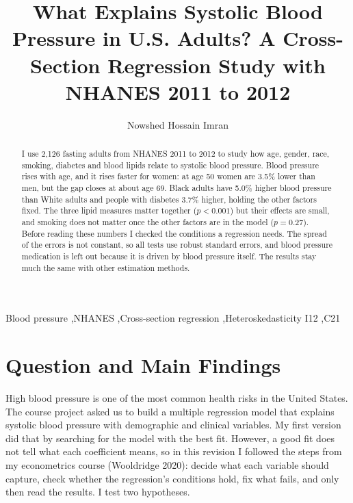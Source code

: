 \documentclass[preprint,letterpaper,11pt,authoryear]{elsarticle}
\begin{document}
\renewcommand{\topfraction}{0.9}
\renewcommand{\textfraction}{0.1}
\renewcommand{\floatpagefraction}{0.8}

\begin{frontmatter}

\title{What Explains Systolic Blood Pressure in U.S. Adults? A Cross-Section Regression Study with NHANES 2011 to 2012}

\author{Nowshed Hossain Imran}

\begin{abstract}
I use 2,126 fasting adults from NHANES 2011 to 2012 to study how age, gender, race, smoking, diabetes and blood lipids relate to systolic blood pressure. Blood pressure rises with age, and it rises faster for women: at age 50 women are 3.5\% lower than men, but the gap closes at about age 69. Black adults have 5.0\% higher blood pressure than White adults and people with diabetes 3.7\% higher, holding the other factors fixed. The three lipid measures matter together ($p < 0.001$) but their effects are small, and smoking does not matter once the other factors are in the model ($p = 0.27$). Before reading these numbers I checked the conditions a regression needs. The spread of the errors is not constant, so all tests use robust standard errors, and blood pressure medication is left out because it is driven by blood pressure itself. The results stay much the same with other estimation methods.
\end{abstract}

\begin{keyword}
Blood pressure \sep NHANES \sep Cross-section regression \sep Heteroskedasticity
\JEL I12 \sep C21
\end{keyword}

\end{frontmatter}

\section{Question and Main Findings}

High blood pressure is one of the most common health risks in the United States. The course project asked us to build a multiple regression model that explains systolic blood pressure with demographic and clinical variables. My first version did that by searching for the model with the best fit. However, a good fit does not tell what each coefficient means, so in this revision I followed the steps from my econometrics course (Wooldridge 2020): decide what each variable should capture, check whether the regression's conditions hold, fix what fails, and only then read the results. I test two hypotheses.
\end{document}
